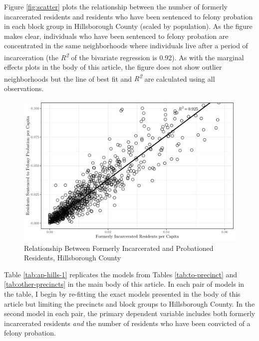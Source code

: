 \documentclass[
  12pt,
]{article}
\begin{document}
Figure \ref{fig:scatter} plots the relationship between the number of formerly incarcerated residents and residents who have been sentenced to felony probation in each block group in Hillsborough County (scaled by population). As the figure makes clear, individuals who have been sentenced to felony probation are concentrated in the same neighborhoods where individuals live after a period of incarceration (the \emph{R\textsuperscript{2}} of the bivariate regression is 0.92). As with the marginal effects plots in the body of this article, the figure does not show outlier neighborhoods but the line of best fit and \emph{R\textsuperscript{2}} are calculated using all observations.

\begin{figure}[H]

{\centering \includegraphics{amendment_4_turnout_files/figure-latex/corrplot-1} 

}

\caption{\label{fig:scatter}Relationship Between Formerly Incarcerated and Probationed Residents, Hillsborough County}\label{fig:corrplot}
\end{figure}

Table \ref{tab:ap-hills-1} replicates the models from Tables \ref{tab:to-precinct} and \ref{tab:other-precincts} in the main body of this article. In each pair of models in the table, I begin by re-fitting the exact models presented in the body of this article but limiting the precincts and block groups to Hillsborough County. In the second model in each pair, the primary dependent variable includes both formerly incarcerated residents \emph{and} the number of residents who have been convicted of a felony probation.
\end{document}
